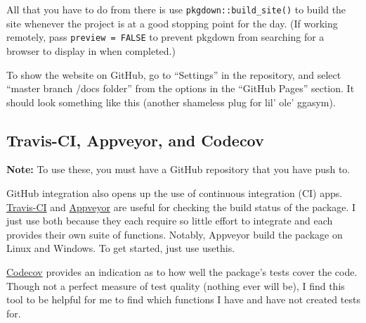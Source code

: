 \documentclass[]{book}
\newenvironment{Shaded}{\begin{snugshade}}{\end{snugshade}}
\newcommand{\CommentTok}[1]{\textcolor[rgb]{0.56,0.35,0.01}{\textit{#1}}}
\newcommand{\KeywordTok}[1]{\textcolor[rgb]{0.13,0.29,0.53}{\textbf{#1}}}
\newcommand{\NormalTok}[1]{#1}
\newcommand{\OperatorTok}[1]{\textcolor[rgb]{0.81,0.36,0.00}{\textbf{#1}}}
\begin{document}
\begin{Shaded}
\end{Shaded}

All that you have to do from there is use \texttt{pkgdown::build\_site()} to build the site whenever the project is at a good stopping point for the day. (If working remotely, pass \texttt{preview\ =\ FALSE} to prevent pkgdown from searching for a browser to display in when completed.)

To show the website on GitHub, go to ``Settings'' in the repository, and select ``master branch /docs folder'' from the options in the ``GitHub Pages'' section. It should look something like this (another shameless plug for lil' ole' ggasym).

\hypertarget{travis-ci-appveyor-and-codecov}{%
\subsection{Travis-CI, Appveyor, and Codecov}\label{travis-ci-appveyor-and-codecov}}

\textbf{Note:} To use these, you must have a GitHub repository that you have push to.

GitHub integration also opens up the use of continuous integration (CI) apps. \href{https://travis-ci.org}{Travis-CI} and \href{https://www.appveyor.com}{Appveyor} are useful for checking the build status of the package. I just use both because they each require so little effort to integrate and each provides their own suite of functions. Notably, Appveyor build the package on Linux and Windows. To get started, just use usethis.

\href{https://codecov.io}{Codecov} provides an indication as to how well the package's tests cover the code. Though not a perfect measure of test quality (nothing ever will be), I find this tool to be helpful for me to find which functions I have and have not created tests for.
\end{document}
